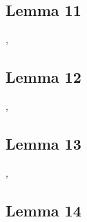 \documentclass[preview]{standalone}
\begin{document}
\subsection[Lemma 11]{\color{section}Lemma 11}

\sep
\pagebreak


\subsection[Lemma 12]{\color{section}Lemma 12}

\sep


\subsection[Lemma 13]{\color{section}Lemma 13}

\sep
\pagebreak


\subsection[Lemma 14]{\color{section}Lemma 14}

\pagebreak
\end{document}
